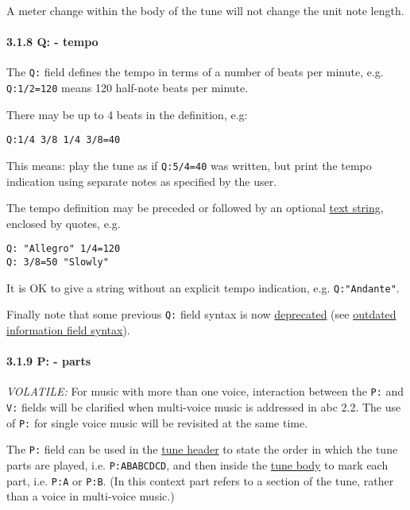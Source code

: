 A meter change within the body of the tune will not change the unit note
length.

\hypertarget{qtempo}{\paragraph{3.1.8 Q: - tempo}\label{qtempo}}

The \texttt{Q:} field defines the tempo in terms of a number of beats
per minute, e.g. \texttt{Q:1/2=120} means 120 half-note beats per
minute.

There may be up to 4 beats in the definition, e.g:

\begin{verbatim}
Q:1/4 3/8 1/4 3/8=40
\end{verbatim}

This means: play the tune as if \texttt{Q:5/4=40} was written, but print
the tempo indication using separate notes as specified by the user.

The tempo definition may be preceded or followed by an optional
\protect\hyperlink{text_string_definition}{text string}, enclosed by
quotes, e.g.

\begin{verbatim}
Q: "Allegro" 1/4=120
Q: 3/8=50 "Slowly"
\end{verbatim}

It is OK to give a string without an explicit tempo indication, e.g.
\texttt{Q:"Andante"}.

Finally note that some previous \texttt{Q:} field syntax is now
\protect\hyperlink{outdated_syntax}{deprecated} (see
\protect\hyperlink{outdated_information_field_syntax}{outdated
information field syntax}).

\hypertarget{pparts}{\paragraph{3.1.9 P: - parts}\label{pparts}}

\emph{VOLATILE:} For music with more than one voice, interaction between
the \texttt{P:} and \texttt{V:} fields will be clarified when
multi-voice music is addressed in abc 2.2. The use of \texttt{P:} for
single voice music will be revisited at the same time.

The \texttt{P:} field can be used in the
\protect\hyperlink{tune_header_definition}{tune header} to state the
order in which the tune parts are played, i.e. \texttt{P:ABABCDCD}, and
then inside the \protect\hyperlink{tune_body_definition}{tune body} to
mark each part, i.e. \texttt{P:A} or \texttt{P:B}. (In this context part
refers to a section of the tune, rather than a voice in multi-voice
music.)

